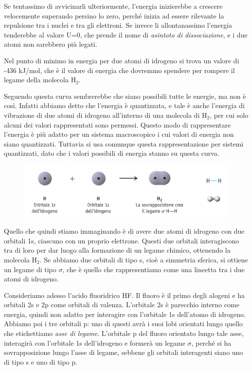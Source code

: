 Se tentassimo di avvicinarli ulteriormente, l'energia inizierebbe a crescere velocemente superando persino lo zero, perché inizia ad essere rilevante la repulsione tra i nuclei e tra gli elettroni. Se invece li allontanassimo l'energia tenderebbe al valore U=0, che prende il nome di \textit{asintoto di dissociazione}, e i due atomi non sarebbero più legati.

Nel punto di minimo in energia per due atomi di idrogeno si trova un valore di -436 kJ/mol, che è il valore di energia che dovremmo spendere per rompere il legame della molecola H$_2$.

\vspace{0.2cm}Seguendo questa curva sembrerebbe che siano possibili tutte le energie, ma non è così. Infatti abbiamo detto che l'energia è quantizzata, e tale è anche l'energia di vibrazione di due atomi di idrogeno all'interno di una molecola di H$_2$, per cui solo alcuni dei valori rappresentati sono permessi. Questo modo di rappresentare l'energia è più adatto per un sistema macroscopico i cui valori di energia non siano quantizzati. Tuttavia si usa comunque questa rappresentazione per sistemi quantizzati, dato che i valori possibili di energia stanno su questa curva.

\vspace{-0.3cm}\begin{figure}[htp]
    \centering
    \includegraphics[width=12cm]{immagini/legame-H_2.png}
\end{figure}

\vspace{-0.5cm}Quello che quindi stiamo immaginando è di avere due atomi di idrogeno con due orbitali 1s, ciascuno con un proprio elettrone. Questi due orbitali interagiscono tra di loro per dar luogo alla formazione di un legame chimico, ottenendo la molecola H$_2$. Se abbiamo due orbitali di tipo s, cioè a simmetria sferica, si ottiene un legame di tipo $\sigma$, che è quello che rappresentiamo come una lineetta tra i due atomi di idrogeno. 

\vspace{0.2cm}Consideriamo adesso l'acido fluoridrico HF. Il fluoro è il primo degli alogeni e ha orbitali 2s e 2p come orbitali di valenza. L'orbitale 2s è parecchio interno come energia, quindi non adatto per interagire con l'orbitale 1s dell'atomo di idrogeno. Abbiamo poi i tre orbitali p: uno di questi avrà i suoi lobi orientati lungo quello che etichettiamo \textit{asse di legame}. L'orbitale p del fluoro orientato lungo tale asse, interagirà con l'orbitale 1s dell'idrogeno e formerà un legame $\sigma$, perché si ha sovrapposizione lungo l'asse di legame, sebbene gli orbitali interagenti siano uno di tipo s e uno di tipo p.

